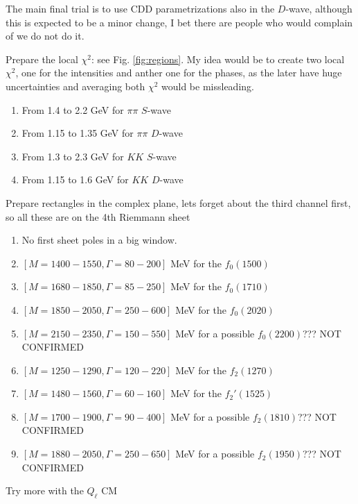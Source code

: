 \begin{todolist}
 \item[\done] The main final trial is to use CDD parametrizations also in the $D$-wave, although this is expected to be a minor change, I bet there are people who would complain of we do not do it.
  
  \item[\done] Prepare the local $\chi^2$: see Fig. \ref{fig:regions}. My idea would be to create two local $\chi^2$, one for the intensities and anther one for the phases, as the later have huge uncertainties and averaging both $\chi^2$ would be missleading.
  {\small
  \begin{enumerate}
  \item From 1.4 to 2.2 GeV for $\pi \pi$ $S$-wave
  \item From 1.15 to 1.35 GeV for $\pi \pi$ $D$-wave
    \item From 1.3 to 2.3 GeV for $K K$ $S$-wave
  \item From 1.15 to 1.6 GeV for $K K$ $D$-wave
  \end{enumerate}}
  \item[\done] Prepare rectangles in the complex
  plane, lets forget about the third channel first, so all these are on the 4th Riemmann sheet
  {\small  
    \begin{enumerate}
    \item No first sheet poles in a big window.
    \item $[M=1400-1550,\Gamma=80-200]$ MeV for the $f_0(1500)$
    \item $[M=1680-1850,\Gamma=85-250]$ MeV for the $f_0(1710)$
    \item $[M=1850-2050,\Gamma=250-600]$ MeV for the $f_0(2020)$
    \item $[M=2150-2350,\Gamma=150-550]$ MeV for a possible $f_0(2200)$??? NOT CONFIRMED
    \item $[M=1250-1290,\Gamma=120-220]$ MeV for the $f_2(1270)$
    \item $[M=1480-1560,\Gamma=60-160]$ MeV for the $f_2'(1525)$
    \item $[M=1700-1900,\Gamma=90-400]$ MeV for a possible $f_2(1810)$???  NOT CONFIRMED
    \item $[M=1880-2050,\Gamma=250-650]$ MeV for a possible $f_2(1950)$???    NOT CONFIRMED  
    \end{enumerate}}
    
    \item[\done] Try more with the $Q_\ell$ CM 



\end{todolist}
